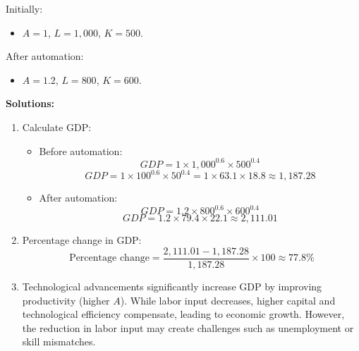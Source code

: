 \documentclass[12pt]{article}
\begin{document}
Initially:
\begin{itemize}
    \item $A = 1$, $L = 1,000$, $K = 500$.
\end{itemize}

After automation:
\begin{itemize}
    \item $A = 1.2$, $L = 800$, $K = 600$.
\end{itemize}

\textbf{Solutions:}
\begin{enumerate}
    \item Calculate GDP:
    \begin{itemize}
        \item Before automation:
        \[ GDP = 1 \times 1,000^{0.6} \times 500^{0.4} \]
        \[ GDP = 1 \times 100^{0.6} \times 50^{0.4} = 1 \times 63.1 \times 18.8 \approx 1,187.28 \]
        \item After automation:
        \[ GDP = 1.2 \times 800^{0.6} \times 600^{0.4} \]
        \[ GDP = 1.2 \times 79.4 \times 22.1 \approx 2,111.01 \]
    \end{itemize}
    \item Percentage change in GDP:
    \[ \text{Percentage change} = \frac{2,111.01 - 1,187.28}{1,187.28} \times 100 \approx 77.8\% \]
    \item Technological advancements significantly increase GDP by improving productivity (higher $A$). While labor input decreases, higher capital and technological efficiency compensate, leading to economic growth. However, the reduction in labor input may create challenges such as unemployment or skill mismatches.
\end{enumerate}
\end{document}
